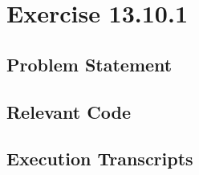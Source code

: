 \documentclass{report}
\begin{document}

 \chapter{Exercise 13.10.1}
 \label{cha:exercise-13.10.1}
  
 \section{Problem Statement}
 \label{sec:problem-statement-1}

\HOLsolutionsOneTheoremsaclExerciseOne
\HOLsolutionsOneTheoremsaclExerciseOneA
\HOLsolutionsOneTheoremsaclExerciseOneB

\section{Relevant Code}
\label{sec:relevant-code-1}


\section{Execution Transcripts}
\label{sec:exec-transcr-1}
\end{document}
